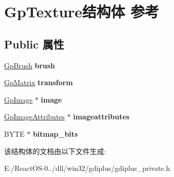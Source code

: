 \hypertarget{struct_gp_texture}{}\section{Gp\+Texture结构体 参考}
\label{struct_gp_texture}
\subsection*{Public 属性}
\begin{DoxyCompactItemize}
\item 
\mbox{\label{struct_gp_texture_a3fd5cccf3b85391d13c6c928011af7a5}} 
\hyperlink{struct_gp_brush}{Gp\+Brush} {\bfseries brush}
\item 
\mbox{\label{struct_gp_texture_ac66ac8b36fccc707b378880d1d1cfae7}} 
\hyperlink{struct_gp_matrix}{Gp\+Matrix} {\bfseries transform}
\item 
\mbox{\label{struct_gp_texture_a85e2cdca71a26de7b16c4f72e7ab3273}} 
\hyperlink{struct_gp_image}{Gp\+Image} $\ast$ {\bfseries image}
\item 
\mbox{\label{struct_gp_texture_a68661b84e14789413bce5d57d1431d57}} 
\hyperlink{struct_gp_image_attributes}{Gp\+Image\+Attributes} $\ast$ {\bfseries imageattributes}
\item 
\mbox{\label{struct_gp_texture_a9b0d11abf450ad9bfa7cfd7ac55889d3}} 
B\+Y\+TE $\ast$ {\bfseries bitmap\+\_\+bits}
\end{DoxyCompactItemize}


该结构体的文档由以下文件生成\+:\begin{DoxyCompactItemize}
\item 
E\+:/\+React\+O\+S-\/0../dll/win32/gdiplus/gdiplus\+\_\+private.\+h\end{DoxyCompactItemize}
